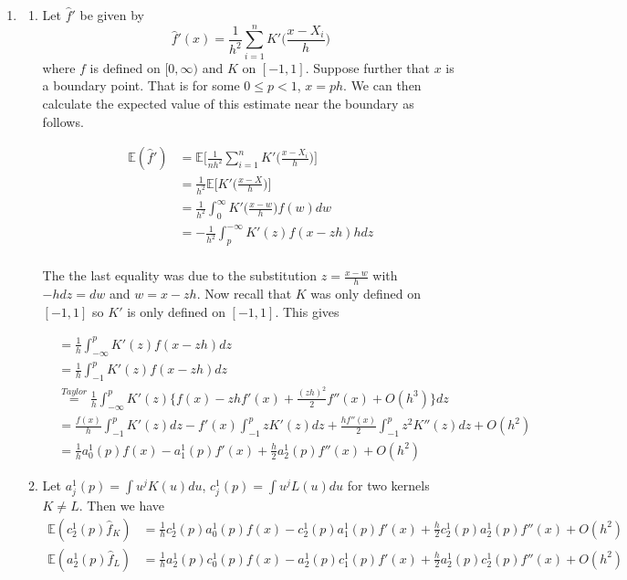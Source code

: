 \documentclass[12pt]{article}  %
\newcommand{\E}{{\mathbb{E}}}
\begin{document}
\begin{enumerate}
\begin{enumerate}
\end{enumerate}

\newpage

\item \begin{enumerate}
\item Let $\widehat{f}'$ be given by $$\widehat{f}'(x) = \frac{1}{h^2}\sum_{i=1}^{n}K'\Big(\frac{x - X_i}{h}\Big)$$ where $f$ is defined on $[0,\infty)$ and $K$ on $[-1,1]$. Suppose further that $x$ is a boundary point. That is for some $0\leq p <1$, $x = ph$. We can then calculate the expected value of this estimate near the boundary as follows. 

\begin{align*}
\E(\widehat{f}') &= \E\bigg[\frac{1}{nh^2}\sum_{i=1}^{n}K'\Big(\frac{x-X_i}{h}\Big)\bigg]\\
&= \frac{1}{h^2}\E\bigg[K'\Big(\frac{x-X}{h}\Big)\bigg]\\
&= \frac{1}{h^2}\int_{0}^{\infty}K'\Big(\frac{x - w}{h}\Big)f(w)dw\\
&=-\frac{1}{h^2}\int_{p}^{-\infty}K'(z)f(x-zh)hdz\\
\end{align*}

The the last equality was due to the substitution $z = \frac{x-w}{h}$ with $-hdz = dw$ and $w = x - zh$. Now recall that $K$ was only defined on $[-1,1]$ so $K'$ is only defined on $[-1,1]$. This gives 

\begin{align*}
&= \frac{1}{h}\int_{-\infty}^{p}K'(z)f(x-zh)dz\\
&= \frac{1}{h}\int_{-1}^{p}K'(z)f(x-zh)dz\\
&\overset{Taylor}{=}\frac{1}{h}\int_{-\infty}^{p}K'(z)\Big\{f(x)- zhf'(x) + \frac{(zh)^2}{2}f''(x) + O(h^3)\Big\}dz\\
&= \frac{f(x)}{h}\int_{-1}^{p}K'(z)dz - f'(x)\int_{-1}^{p}zK'(z)dz + \frac{hf''(x)}{2}\int_{-1}^{p}z^2K''(z)dz + O(h^2)\\
&= \frac{1}{h}a_0^1(p)f(x) - a_1^1(p)f'(x) + \frac{h}{2}a_2^1(p)f''(x) + O(h^2)
\end{align*}

\item Let $a_j^{1}(p) = \int u^jK(u)du$, $c_j^1(p)=\int u^jL(u)du$ for two kernels $K \neq L$. Then we have 
\begin{align*}
\E(c_2^1(p)\hat{f}_{K}) &= \frac{1}{h}c_2^1(p)a_0^1(p)f(x) - c_2^1(p)a_1^1(p)f'(x)+\frac{h}{2}c_2^1(p)a_2^1(p)f''(x)+O(h^2)\\
\E(a_2^1(p)\hat{f}_{L}) &= \frac{1}{h}a_2^1(p)c_0^1(p)f(x) - a_2^1(p)c_1^1(p)f'(x)+\frac{h}{2}a_2^1(p)c_2^1(p)f''(x)+O(h^2)
\end{align*}


\end{enumerate}
\end{enumerate}
\end{document}
